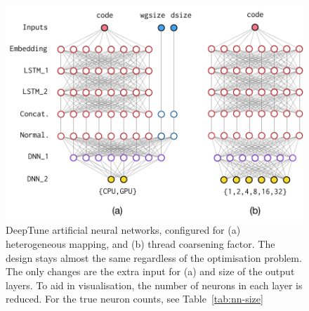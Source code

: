 \begin{figure}[t!]
  \centering
  \includegraphics[width=\columnwidth]{img/nn} %
  \caption[DeepTune artificial neural networks]{%
    DeepTune artificial neural networks, configured for (a) heterogeneous mapping, and (b) thread coarsening factor. The design stays almost the same regardless of the optimisation problem. The only changes are the extra input for (a) and size of the output layers. To aid in visualisation, the number of neurons in each layer is reduced. For the true neuron counts, see Table~\ref{tab:nn-size}%
  }%
  \label{fig:nn}
\end{figure}

